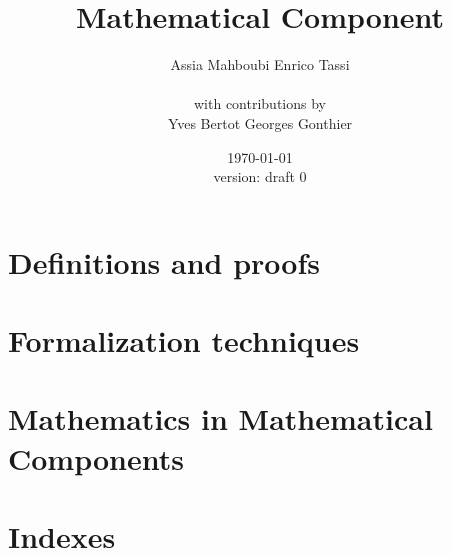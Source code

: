\documentclass{book}
\title{Mathematical Component}
\author{Assia Mahboubi \hspace{1cm} Enrico Tassi\\~\\{\small with contributions by}\\Yves Bertot \hspace{1cm} Georges Gonthier}
\date{\today\\\small{version: draft 0}}
\begin{document}
\maketitle



\tableofcontents{}

\part{Definitions and proofs}






\part{Formalization techniques}





\part{Mathematics in Mathematical Components}







\part{Indexes}

\printindex[concept]
\printindex[ssr]
\printindex[coq]
\printindex[vernac]



\end{document}
